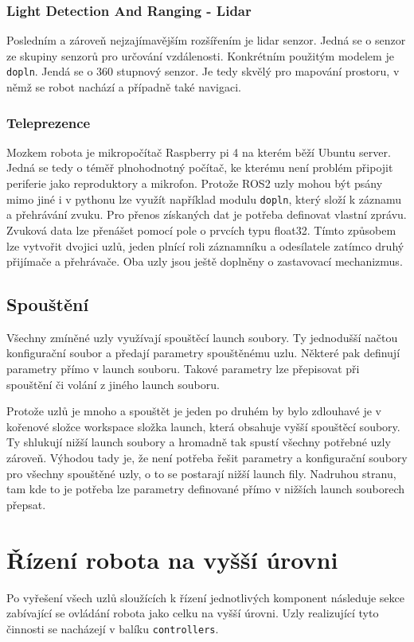 \subsubsection*{Light Detection And Ranging - Lidar}
Posledním a zároveň nejzajímavějším rozšířením je lidar senzor. Jedná se o senzor ze skupiny senzorů pro určování vzdálenosti. Konkrétním použitým modelem je \verb|dopln|. Jendá se o 360 stupnový senzor. Je tedy skvělý pro mapování prostoru, v němž se robot nachází a případně také navigaci.

\subsubsection*{Teleprezence}
Mozkem robota je mikropočítač Raspberry pi 4 na kterém běží Ubuntu server. Jedná se tedy o téměř plnohodnotný počítač, ke kterému není problém připojit periferie jako reproduktory a mikrofon. Protože ROS2 uzly mohou být psány mimo jiné i v pythonu lze využít například modulu \verb|dopln|, který složí k záznamu a přehrávání zvuku. Pro přenos získaných dat je potřeba definovat vlastní zprávu. Zvuková data lze přenášet pomocí pole o prvcích typu float32. Tímto způsobem lze vytvořit dvojici uzlů, jeden plnící roli záznamníku a odesílatele zatímco druhý přijímače a přehrávače. Oba uzly jsou ještě doplněny o zastavovací mechanizmus.

\subsection*{Spouštění}
Všechny zmíněné uzly využívají spouštěcí launch soubory. Ty jednodušší načtou konfigurační soubor a předají parametry spouštěnému uzlu. Některé pak definují parametry přímo v launch souboru. Takové parametry lze přepisovat při spouštění či volání z jiného launch souboru.

Protože uzlů je mnoho a spouštět je jeden po druhém by bylo zdlouhavé je v kořenové složce workspace složka launch, která obsahuje vyšší spouštěcí soubory. Ty shlukují nižší launch soubory a hromadně tak spustí všechny potřebné uzly zároveň. Výhodou tady je, že není potřeba řešit parametry a konfigurační soubory pro všechny spouštěné uzly, o to se postarají nižší launch fily. Nadruhou stranu, tam kde to je potřeba lze parametry definované přímo v nižších launch souborech přepsat.

\section{Řízení robota na vyšší úrovni}
Po vyřešení všech uzlů sloužících k řízení jednotlivých komponent následuje sekce zabívající se ovládání robota jako celku na vyšší úrovni. Uzly realizující tyto činnosti se nacházejí v balíku \verb|controllers|. 

